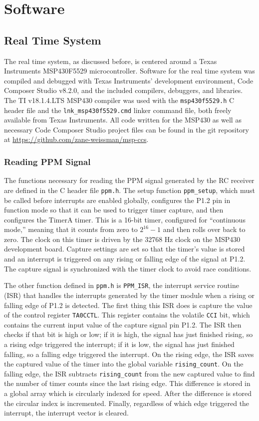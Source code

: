 \documentclass[titlepage, letterpaper,12pt]{article}
\begin{document}
\section{Software}
\subsection{Real Time System}
The real time system, as discussed before, is centered around a Texas Instruments MSP430F5529 microcontroller. Software for the real time system was compiled and debugged with Texas Instruments' development environment, Code Composer Studio v8.2.0, and the included compilers, debuggers, and libraries. The TI v18.1.4.LTS MSP430 compiler was used with the \texttt{msp430f5529.h} C header file and the \texttt{lnk\_msp430f5529.cmd} linker command file, both freely available from Texas Instruments. All code written for the MSP430 as well as necessary Code Composer Studio project files can be found in the git repository at \url{https://github.com/zane-weissman/msp-ccs}.
\subsubsection{Reading PPM Signal}
The functions necessary for reading the PPM signal generated by the RC receiver are defined in the C header file \texttt{ppm.h}. The setup function \texttt{ppm\_setup}, which must be called before interrupts are enabled globally, configures the P1.2 pin in function mode so that it can be used to trigger timer capture, and then configures the TimerA timer. This is a 16-bit timer, configured for ``continuous mode,'' meaning that it counts from zero to $2^{16}-1$ and then rolls over back to zero. The clock on this timer is driven by the 32768 Hz clock on the MSP430 development board. Capture settings are set so that the timer's value is stored and an interrupt is triggered on any rising or falling edge of the signal at P1.2. The capture signal is synchronized with the timer clock to avoid race conditions.

The other function defined in \texttt{ppm.h} is \texttt{PPM\_ISR}, the interrupt service routine (ISR) that handles the interrupts generated by the timer module when a rising or falling edge of P1.2 is detected. The first thing this ISR does is capture the value of the control register \texttt{TA0CCTL}. This register contains the volatile \texttt{CCI} bit, which contains the current input value of the capture signal pin P1.2. The ISR then checks if that bit is high or low; if it is high, the signal has just finished rising, so a rising edge triggered the interrupt; if it is low, the signal has just finished falling, so a falling edge triggered the interrupt. On the rising edge, the ISR saves the captured value of the timer into the global variable \texttt{rising\_count}. On the falling edge, the ISR subtracts \texttt{rising\_count} from the new captured value to find the number of timer counts since the last rising edge. This difference is stored in a global array which is circularly indexed for speed. After the difference is stored the circular index is incremented. Finally, regardless of which edge triggered the interrupt, the interrupt vector is cleared.
\end{document}

